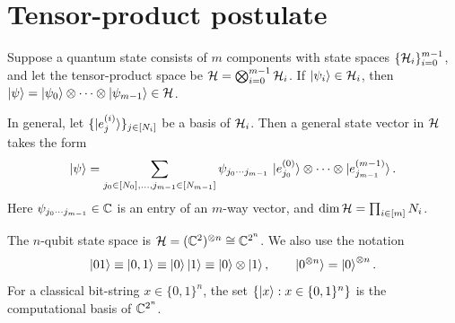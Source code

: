 \section{Tensor-product postulate}\label{sec:sec01-tensor}

Suppose a quantum state consists of $m$ components with state spaces
$\{\mathcal{H}_i\}_{i=0}^{m-1}$, and let the tensor-product space be
$\mathcal{H} = \bigotimes_{i=0}^{m-1} \mathcal{H}_i$. If $\ket{\psi_i} \in \mathcal{H}_i$, then
$\ket{\psi} = \ket{\psi_0} \otimes \cdots \otimes \ket{\psi_{m-1}} \in \mathcal{H}$.

In general, let $\{\ket{e_j^{(i)}}\}_{j \in [N_i]}$ be a basis of $\mathcal{H}_i$. Then
a general state vector in $\mathcal{H}$ takes the form
\begin{equation}
  \ket{\psi} = \sum_{j_0 \in [N_0], \dots, j_{m-1} \in [N_{m-1}]}
    \psi_{j_0 \cdots j_{m-1}}\,
    \ket{e_{j_0}^{(0)}} \otimes \cdots \otimes \ket{e_{j_{m-1}}^{(m-1)}}.
\end{equation}
Here $\psi_{j_0 \cdots j_{m-1}} \in \mathbb{C}$ is an entry of an $m$-way vector, and
$\dim \mathcal{H} = \prod_{i \in [m]} N_i$.

The $n$-qubit state space is $\mathcal{H} = (\mathbb{C}^2)^{\otimes n} \cong \mathbb{C}^{2^n}$. We also
use the notation
\begin{equation}
  \ket{01} \equiv \ket{0,1} \equiv \ket{0}\ket{1} \equiv \ket{0}\otimes\ket{1},
  \qquad \ket{0^{\otimes n}} = \ket{0}^{\otimes n}.
\end{equation}
For a classical bit-string $x \in \{0,1\}^n$, the set
$\{\ket{x} : x \in \{0,1\}^n\}$ is the computational basis of $\mathbb{C}^{2^n}$.

